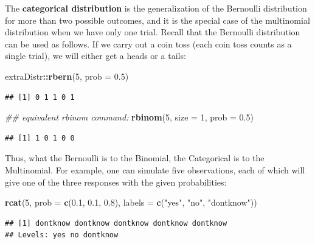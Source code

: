 \documentclass[12pt,]{krantz}
\newenvironment{Shaded}{\begin{snugshade}}{\end{snugshade}}
\newcommand{\CommentTok}[1]{\textcolor[rgb]{0.56,0.35,0.01}{\textit{#1}}}
\newcommand{\DataTypeTok}[1]{\textcolor[rgb]{0.13,0.29,0.53}{#1}}
\newcommand{\DecValTok}[1]{\textcolor[rgb]{0.00,0.00,0.81}{#1}}
\newcommand{\FloatTok}[1]{\textcolor[rgb]{0.00,0.00,0.81}{#1}}
\newcommand{\KeywordTok}[1]{\textcolor[rgb]{0.13,0.29,0.53}{\textbf{#1}}}
\newcommand{\NormalTok}[1]{#1}
\newcommand{\OperatorTok}[1]{\textcolor[rgb]{0.81,0.36,0.00}{\textbf{#1}}}
\newcommand{\StringTok}[1]{\textcolor[rgb]{0.31,0.60,0.02}{#1}}
\theoremstyle{definition}
\theoremstyle{definition}
\theoremstyle{definition}
\theoremstyle{remark}
\begin{document}
The \textbf{categorical distribution} is the generalization of the Bernoulli distribution for more than two possible outcomes, and it is the special case of the multinomial distribution when we have only one trial. Recall that the Bernoulli distribution can be used as follows. If we carry out a coin toss (each coin toss counts as a single trial), we will either get a heads or a tails:

\begin{Shaded}
\begin{Highlighting}[]
\NormalTok{extraDistr}\OperatorTok{::}\KeywordTok{rbern}\NormalTok{(}\DecValTok{5}\NormalTok{, }\DataTypeTok{prob =} \FloatTok{0.5}\NormalTok{)}
\end{Highlighting}
\end{Shaded}

\begin{verbatim}
## [1] 0 1 1 0 1
\end{verbatim}

\begin{Shaded}
\begin{Highlighting}[]
\CommentTok{## equivalent rbinom command:}
\KeywordTok{rbinom}\NormalTok{(}\DecValTok{5}\NormalTok{, }\DataTypeTok{size =} \DecValTok{1}\NormalTok{, }\DataTypeTok{prob =} \FloatTok{0.5}\NormalTok{)}
\end{Highlighting}
\end{Shaded}

\begin{verbatim}
## [1] 1 0 1 0 0
\end{verbatim}

Thus, what the Bernoulli is to the Binomial, the Categorical is to the Multinomial. For example, one can simulate five observations, each of which will give one of the three responses with the given probabilities:

\begin{Shaded}
\begin{Highlighting}[]
\KeywordTok{rcat}\NormalTok{(}\DecValTok{5}\NormalTok{, }\DataTypeTok{prob =} \KeywordTok{c}\NormalTok{(}\FloatTok{0.1}\NormalTok{, }\FloatTok{0.1}\NormalTok{, }\FloatTok{0.8}\NormalTok{), }\DataTypeTok{labels =} \KeywordTok{c}\NormalTok{(}\StringTok{"yes"}\NormalTok{, }\StringTok{"no"}\NormalTok{, }\StringTok{"dontknow"}\NormalTok{))}
\end{Highlighting}
\end{Shaded}

\begin{verbatim}
## [1] dontknow dontknow dontknow dontknow dontknow
## Levels: yes no dontknow
\end{verbatim}
\end{document}
